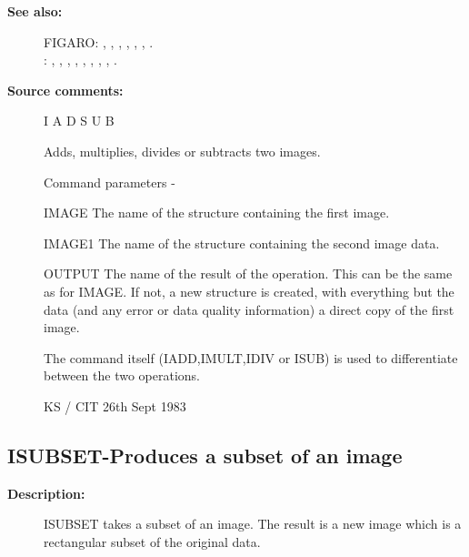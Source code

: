 \begin{description}
\begin{description}
\item [\textbf{See also:}]
FIGARO: , , , , , , .\\
: , , , , , , , , .\\

\item [\textbf{Source comments:}]
\begin{terminalv}
 I A D S U B

 Adds, multiplies, divides or subtracts two images.

 Command parameters -

 IMAGE  The name of the structure containing the first image.

 IMAGE1 The name of the structure containing the second
        image data.

 OUTPUT The name of the result of the operation.  This can
        be the same as for IMAGE.  If not, a new structure
        is created, with everything but the data (and any error
        or data quality information) a direct copy of the first
        image.

 The command itself (IADD,IMULT,IDIV or ISUB) is used to
 differentiate between the two operations.

                                  KS / CIT 26th Sept 1983
\end{terminalv}
\end{description}
\subsection{ISUBSET-\label{ISUBSET}Produces a subset of an image}
\begin{description}

\item [\textbf{Description:}]
 ISUBSET takes a subset of an image.  The result is a new image
 which is a rectangular subset of the original data.


\end{description}
\end{description}
